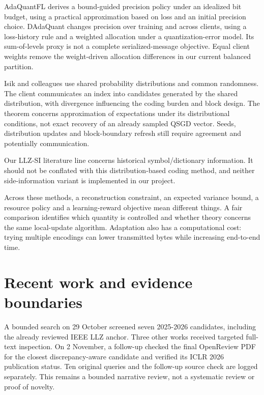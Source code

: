AdaQuantFL derives a bound-guided precision policy under an idealized bit budget, using a practical approximation based on loss and an initial precision choice. DAdaQuant changes precision over training and across clients, using a loss-history rule and a weighted allocation under a quantization-error model. Its sum-of-levels proxy is not a complete serialized-message objective. Equal client weights remove the weight-driven allocation differences in our current balanced partition. \parencite{jhunjhunwala2021adaquantfl,honig2022dadaquant}

Isik and colleagues use shared probability distributions and common randomness. The client communicates an index into candidates generated by the shared distribution, with divergence influencing the coding burden and block design. The theorem concerns approximation of expectations under its distributional conditions, not exact recovery of an already sampled QSGD vector. Seeds, distribution updates and block-boundary refresh still require agreement and potentially communication. \parencite{isik2024sideinformation}

Our LLZ-SI literature line concerns historical symbol/dictionary information. It should not be conflated with this distribution-based coding method, and neither side-information variant is implemented in our project.

Across these methods, a reconstruction constraint, an expected variance bound, a resource policy and a learning-reward objective mean different things. A fair comparison identifies which quantity is controlled and whether theory concerns the same local-update algorithm. Adaptation also has a computational cost: trying multiple encodings can lower transmitted bytes while increasing end-to-end time.

\section{Recent work and evidence boundaries}

A bounded search on 29 October screened seven 2025-2026 candidates, including the already reviewed IEEE LLZ anchor. Three other works received targeted full-text inspection. On 2 November, a follow-up checked the final OpenReview PDF for the closest discrepancy-aware candidate and verified its ICLR 2026 publication status. Ten original queries and the follow-up source check are logged separately. This remains a bounded narrative review, not a systematic review or proof of novelty.


